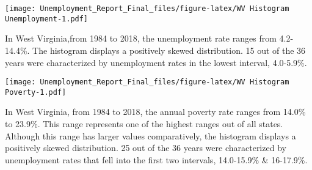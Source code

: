 \documentclass[
]{article}
\newenvironment{Shaded}{\begin{snugshade}}{\end{snugshade}}
\newcommand{\CharTok}[1]{\textcolor[rgb]{0.31,0.60,0.02}{#1}}
\newcommand{\DataTypeTok}[1]{\textcolor[rgb]{0.13,0.29,0.53}{#1}}
\newcommand{\DecValTok}[1]{\textcolor[rgb]{0.00,0.00,0.81}{#1}}
\newcommand{\KeywordTok}[1]{\textcolor[rgb]{0.13,0.29,0.53}{\textbf{#1}}}
\newcommand{\NormalTok}[1]{#1}
\newcommand{\OperatorTok}[1]{\textcolor[rgb]{0.81,0.36,0.00}{\textbf{#1}}}
\newcommand{\StringTok}[1]{\textcolor[rgb]{0.31,0.60,0.02}{#1}}
\begin{document}
\begin{Shaded}
\end{Shaded}

\texttt{[image: Unemployment\_Report\_Final\_files/figure-latex/WV Histogram Unemployment-1.pdf]}

In West Virginia,from 1984 to 2018, the unemployment rate ranges from
4.2-14.4\%. The histogram displays a positively skewed distribution. 15
out of the 36 years were characterized by unemployment rates in the
lowest interval, 4.0-5.9\%.

\begin{Shaded}
\end{Shaded}

\texttt{[image: Unemployment\_Report\_Final\_files/figure-latex/WV Histogram Poverty-1.pdf]}

In West Virginia, from 1984 to 2018, the annual poverty rate ranges from
14.0\% to 23.9\%. This range represents one of the highest ranges out of
all states. Although this range has larger values comparatively, the
histogram displays a positively skewed distribution. 25 out of the 36
years were characterized by unemployment rates that fell into the first
two intervals, 14.0-15.9\% \& 16-17.9\%.

\begin{Shaded}
\end{Shaded}
\end{document}
